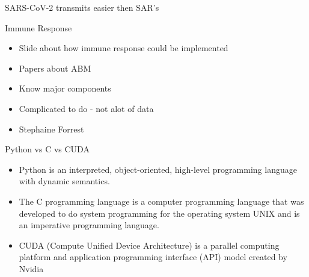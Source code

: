 \documentclass{beamer}
\begin{document}
\begin{frame}{}
    \begin{center}
        SARS-CoV-2 transmits easier then SAR's
    \end{center}
\end{frame}

\begin{frame}{}
    \begin{center}
    \end{center}
\end{frame}

\begin{frame}{Immune Response}
    \begin{center}
        \begin{itemize}
            \item Slide about how immune response could be implemented
            \item Papers about ABM
            \item Know major components
            \item Complicated to do - not alot of data
            \item Stephaine Forrest
        \end{itemize}
    \end{center}
\end{frame}

\begin{frame}{Python vs C vs CUDA}
    \begin{center}
        \begin{itemize}
            \item Python is an interpreted, object-oriented, high-level programming language with dynamic semantics.
            \item The C programming language is a computer programming language that was developed to do system programming for the operating system UNIX and is an imperative programming language.
            \item CUDA (Compute Unified Device Architecture) is a parallel computing platform and application programming interface (API) model created by Nvidia

        \end{itemize}
    \end{center}
\end{frame}
\end{document}
